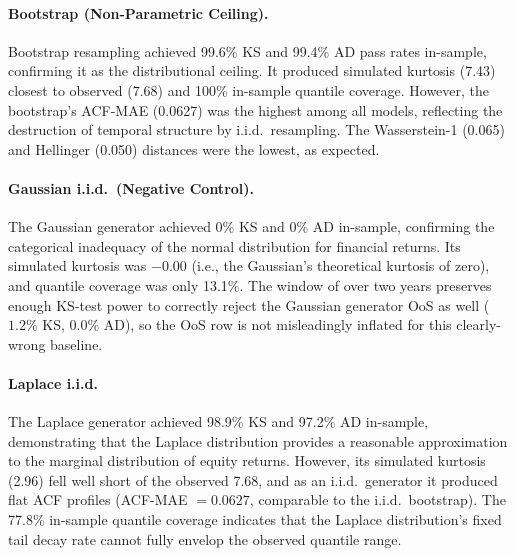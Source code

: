 \paragraph{Bootstrap (Non-Parametric Ceiling).}
Bootstrap resampling achieved 99.6\% KS and 99.4\% AD pass rates in-sample, confirming it as the distributional ceiling.
It produced simulated kurtosis (7.43) closest to observed (7.68) and 100\% in-sample quantile coverage.
However, the bootstrap's ACF-MAE (0.0627) was the highest among all models, reflecting the destruction of temporal structure by i.i.d.\ resampling.
The Wasserstein-1 (0.065) and Hellinger (0.050) distances were the lowest, as expected.

\paragraph{Gaussian i.i.d.\ (Negative Control).}
The Gaussian generator achieved 0\% KS and 0\% AD in-sample, confirming the categorical inadequacy of the normal distribution for financial returns.
Its simulated kurtosis was $-0.00$ (i.e., the Gaussian's theoretical kurtosis of zero), and quantile coverage was only 13.1\%.
The  window of over two years preserves enough KS-test power to correctly reject the Gaussian generator OoS as well ($1.2\%$ KS, $0.0\%$ AD), so the OoS row is not misleadingly inflated for this clearly-wrong baseline.

\paragraph{Laplace i.i.d.}
The Laplace generator achieved 98.9\% KS and 97.2\% AD in-sample, demonstrating that the Laplace distribution provides a reasonable approximation to the marginal distribution of equity returns.
However, its simulated kurtosis (2.96) fell well short of the observed 7.68, and as an i.i.d.\ generator it produced flat ACF profiles (ACF-MAE $= 0.0627$, comparable to the i.i.d.\ bootstrap).
The 77.8\% in-sample quantile coverage indicates that the Laplace distribution's fixed tail decay rate cannot fully envelop the observed quantile range.

